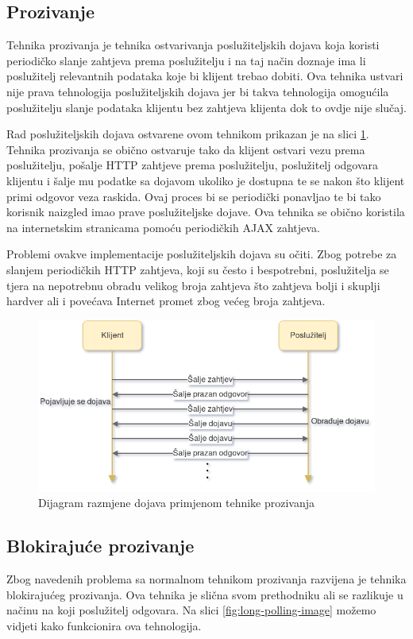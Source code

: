 \documentclass[times, utf8, zavrsni]{fer}
\begin{document}
\subsection{Prozivanje}
Tehnika prozivanja  je tehnika ostvarivanja poslužiteljskih dojava koja koristi periodičko slanje zahtjeva prema poslužitelju i na taj način doznaje ima li poslužitelj relevantnih podataka koje bi klijent trebao dobiti. Ova tehnika ustvari nije prava tehnologija poslužiteljskih dojava jer bi takva tehnologija omogućila poslužitelju slanje podataka klijentu bez zahtjeva klijenta dok to ovdje nije slučaj.

Rad poslužiteljskih dojava ostvarene ovom tehnikom prikazan je na slici \ref{fig:polling-image}. Tehnika prozivanja se obično ostvaruje tako da klijent ostvari vezu prema poslužitelju, pošalje HTTP zahtjeve prema poslužitelju, poslužitelj odgovara klijentu i šalje mu podatke sa dojavom ukoliko je dostupna te se nakon što klijent primi odgovor veza raskida. Ovaj proces bi se periodički ponavljao te bi tako korisnik naizgled imao prave poslužiteljske dojave. Ova tehnika se obično koristila na internetskim stranicama pomoću periodičkih AJAX zahtjeva. 

Problemi ovakve implementacije poslužiteljskih dojava su očiti. Zbog potrebe za slanjem periodičkih HTTP zahtjeva, koji su često i bespotrebni, poslužitelja se tjera na nepotrebnu obradu velikog broja zahtjeva što zahtjeva bolji i skuplji hardver ali i povećava Internet promet zbog većeg broja zahtjeva.

\begin{figure}[htb]
\centering
\includegraphics[width=\linewidth]{img/polling.png}
\caption{Dijagram razmjene dojava primjenom tehnike prozivanja}
\label{fig:polling-image}
\end{figure}

\subsection{Blokirajuće prozivanje}
Zbog navedenih problema sa normalnom tehnikom prozivanja razvijena je tehnika blokirajućeg prozivanja. Ova tehnika je slična svom prethodniku ali se razlikuje u načinu na koji poslužitelj odgovara. Na slici \ref{fig:long-polling-image} možemo vidjeti kako funkcionira ova tehnologija. 
\end{document}

